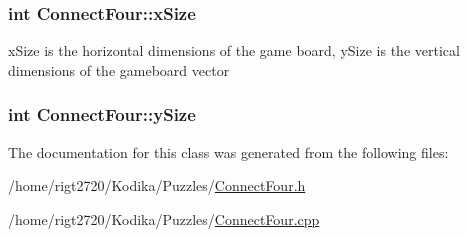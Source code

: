 \hypertarget{classConnectFour_a9ebcc46eaaac1805eab8b90925f83a63}{
\subsubsection[{x\-Size}]{\setlength{\rightskip}{0pt plus 5cm}int Connect\-Four\-::x\-Size\hspace{0.3cm}{\ttfamily [private]}}}\label{classConnectFour_a9ebcc46eaaac1805eab8b90925f83a63}
x\-Size is the horizontal dimensions of the game board, y\-Size is the vertical dimensions of the gameboard vector \hypertarget{classConnectFour_acd39fbfa19a81ab05e7aae3ac51e9ed8}{
\subsubsection[{y\-Size}]{\setlength{\rightskip}{0pt plus 5cm}int Connect\-Four\-::y\-Size\hspace{0.3cm}{\ttfamily [private]}}}\label{classConnectFour_acd39fbfa19a81ab05e7aae3ac51e9ed8}


The documentation for this class was generated from the following files\-:\begin{DoxyCompactItemize}
\item 
/home/rigt2720/\-Kodika/\-Puzzles/\hyperlink{ConnectFour_8h}{Connect\-Four.\-h}\item 
/home/rigt2720/\-Kodika/\-Puzzles/\hyperlink{ConnectFour_8cpp}{Connect\-Four.\-cpp}\end{DoxyCompactItemize}
